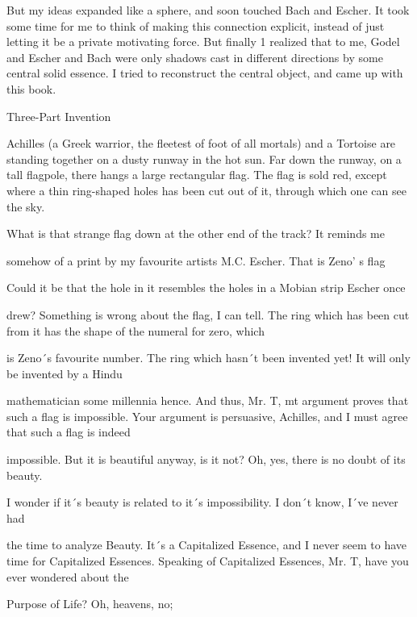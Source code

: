 But my ideas expanded like a sphere, and soon touched Bach and Escher. It took some time for me to think of making this connection explicit, instead of just letting it be a private motivating force. But finally 1 realized that to me, Godel and Escher and Bach were only shadows cast in different directions by some central solid essence. I tried to reconstruct the central object, and came up with this book. 







Three-Part Invention 

Achilles (a Greek warrior, the fleetest of foot of all mortals) and a Tortoise are standing together on a dusty runway in the hot sun. Far down the runway, on a tall flagpole, there hangs a large rectangular flag. The flag is sold red, except where a thin ring-shaped holes has been cut out of it, through which one can see the sky. 


\achilles What is that strange flag down at the other end of the track? It reminds me\par
somehow of a print by my favourite artists M.C. Escher. 
\tortoise That is Zeno’ s flag\par

\achilles Could it be that the hole in it resembles the holes in a Mobian strip Escher once\par
drew? Something is wrong about the flag, I can tell. 
\tortoise The ring which has been cut from it has the shape of the numeral for zero, which\par
is Zeno´s favourite number. 
\achilles The ring which hasn´t been invented yet! It will only be invented by a Hindu\par
mathematician some millennia hence. And thus, Mr. T, mt argument proves that such a flag is impossible. 
\tortoise Your argument is persuasive, Achilles, and I must agree that such a flag is indeed\par
impossible. But it is beautiful anyway, is it not? 
\achilles Oh, yes, there is no doubt of its beauty.\par

\tortoise I wonder if it´s beauty is related to it´s impossibility. I don´t know, I´ve never had\par
the time to analyze Beauty. It´s a Capitalized Essence, and I never seem to have time for Capitalized Essences. 
\achilles Speaking of Capitalized Essences, Mr. T, have you ever wondered about the\par
Purpose of Life? 
\tortoise Oh, heavens, no;\par

